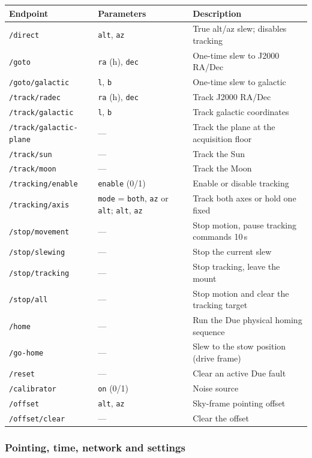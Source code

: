 \documentclass[11pt,a4paper]{article}
\begin{document}
\footnotesize
\begin{longtable}{lp{4.0cm}p{5.4cm}}
\toprule
\textbf{Endpoint} & \textbf{Parameters} & \textbf{Description} \\
\midrule
\endhead
\texttt{/direct} & \texttt{alt}, \texttt{az} & True alt/az slew; disables tracking \\
\texttt{/goto} & \texttt{ra} (h), \texttt{dec} & One-time slew to J2000 RA/Dec \\
\texttt{/goto/galactic} & \texttt{l}, \texttt{b} & One-time slew to galactic \\
\texttt{/track/radec} & \texttt{ra} (h), \texttt{dec} & Track J2000 RA/Dec \\
\texttt{/track/galactic} & \texttt{l}, \texttt{b} & Track galactic coordinates \\
\texttt{/track/galactic-plane} & --- & Track the plane at the acquisition floor \\
\texttt{/track/sun} & --- & Track the Sun \\
\texttt{/track/moon} & --- & Track the Moon \\
\texttt{/tracking/enable} & \texttt{enable} (0/1) & Enable or disable tracking \\
\texttt{/tracking/axis} & \texttt{mode} = \texttt{both}, \texttt{az} or \texttt{alt}; \texttt{alt}, \texttt{az} & Track both axes or hold one fixed \\
\texttt{/stop/movement} & --- & Stop motion, pause tracking commands 10\,s \\
\texttt{/stop/slewing} & --- & Stop the current slew \\
\texttt{/stop/tracking} & --- & Stop tracking, leave the mount \\
\texttt{/stop/all} & --- & Stop motion and clear the tracking target \\
\texttt{/home} & --- & Run the Due physical homing sequence \\
\texttt{/go-home} & --- & Slew to the stow position (drive frame) \\
\texttt{/reset} & --- & Clear an active Due fault \\
\texttt{/calibrator} & \texttt{on} (0/1) & Noise source \\
\texttt{/offset} & \texttt{alt}, \texttt{az} & Sky-frame pointing offset \\
\texttt{/offset/clear} & --- & Clear the offset \\
\bottomrule
\end{longtable}

\subsubsection{Pointing, time, network and settings}
\end{document}

